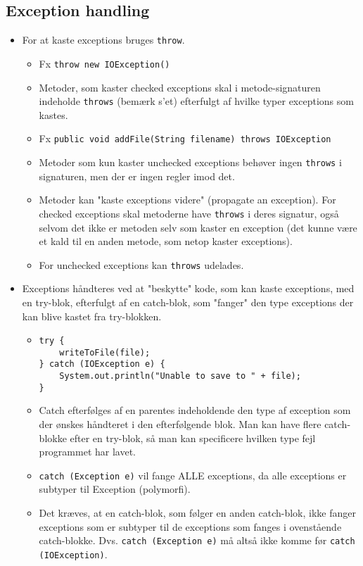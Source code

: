 \subsection{Exception handling}
\begin{itemize}
  \item For at kaste exceptions bruges \verb|throw|.
  \begin{itemize}
    \item Fx \verb|throw new IOException()|
    \item Metoder, som kaster checked exceptions skal i metode-signaturen indeholde \verb|throws| (bemærk s'et) efterfulgt af hvilke typer exceptions som kastes.
    \item Fx \verb|public void addFile(String filename) throws IOException|
    \item Metoder som kun kaster unchecked exceptions behøver ingen \verb|throws| i signaturen, men der er ingen regler imod det.
    \item Metoder kan "kaste exceptions videre" (propagate an exception). For checked exceptions skal metoderne have \verb|throws| i deres signatur, også selvom det ikke er metoden selv som kaster en exception (det kunne være et kald til en anden metode, som netop kaster exceptions).
    \item For unchecked exceptions kan \verb|throws| udelades.
  \end{itemize}
  \item Exceptions håndteres ved at "beskytte" kode, som kan kaste exceptions, med en try-blok, efterfulgt af en catch-blok, som "fanger" den type exceptions der kan blive kastet fra try-blokken.
  \begin{itemize}
    \item
      \begin{verbatim}
try {
    writeToFile(file);
} catch (IOException e) {
    System.out.println("Unable to save to " + file);
}
      \end{verbatim}
    \item Catch efterfølges af en parentes indeholdende den type af exception som der ønskes håndteret i den efterfølgende blok. Man kan have flere catch-blokke efter en try-blok, så man kan specificere hvilken type fejl programmet har lavet.
    \item \verb|catch (Exception e)| vil fange ALLE exceptions, da alle exceptions er subtyper til Exception (polymorfi).
    \item Det kræves, at en catch-blok, som følger en anden catch-blok, ikke fanger exceptions som er subtyper til de exceptions som fanges i ovenstående catch-blokke. Dvs. \verb|catch (Exception e)| må altså ikke komme før \verb|catch (IOException)|.

\end{itemize}
\end{itemize}

